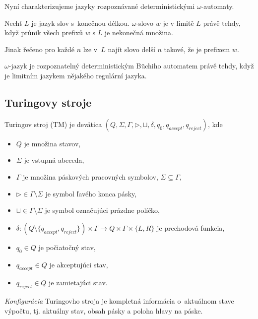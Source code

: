 Nyní charakterizujeme jazyky rozpoznávané deterministickými $\omega$-automaty.

\begin{definition}
    Nechť $L$ je jazyk slov s~konečnou délkou.
    $\omega$-slovo $w$ je v limitě $L$ právě tehdy,
    když průnik všech prefixů $w$ s $L$ je nekonečná množina.
\end{definition}

Jinak řečeno pro každé $n$ lze v~$L$ najít slovo delší $n$ takové, že
je prefixem $w$.

\begin{theorem}
$\omega$-jazyk je rozpoznatelný deterministickým Büchiho automatem
právě tehdy, když je limitním jazykem nějakého regulární jazyka.
\end{theorem}


\subsection{Turingovy stroje}

\begin{definition}
    Turingov stroj (TM) je devätica $(Q, \Sigma, \Gamma, \triangleright,
	\sqcup, \delta, q_0, q_{accept}, q_{reject})$, kde
	\begin{itemize}
		\item $Q$ je množina stavov,
		\item $\Sigma$ je vstupná abeceda,
		\item $\Gamma$ je množina páskových pracovných symbolov, $\Sigma \subseteq \Gamma$,
		\item $\triangleright \in \Gamma \setminus \Sigma$ je symbol ľavého konca pásky,
		\item $\sqcup \in \Gamma \setminus \Sigma$ je symbol označujúci prázdne políčko,
		\item $\delta : (Q \setminus \{q_{accept}, q_{reject} \}) \times \Gamma \to Q \times \Gamma \times \{L,R \}$ je prechodová funkcia,
		\item $q_0 \in Q$ je počiatočný stav,
		\item $q_{accept} \in Q$ je akceptujúci stav,
		\item $q_{reject} \in Q$ je zamietajúci stav.
	\end{itemize}
\end{definition}

{\em Konfigurácia} Turingovho stroja je kompletná informácia
o~aktuálnom stave výpočtu, tj. aktuálny stav, obsah pásky
a poloha hlavy na páske.

